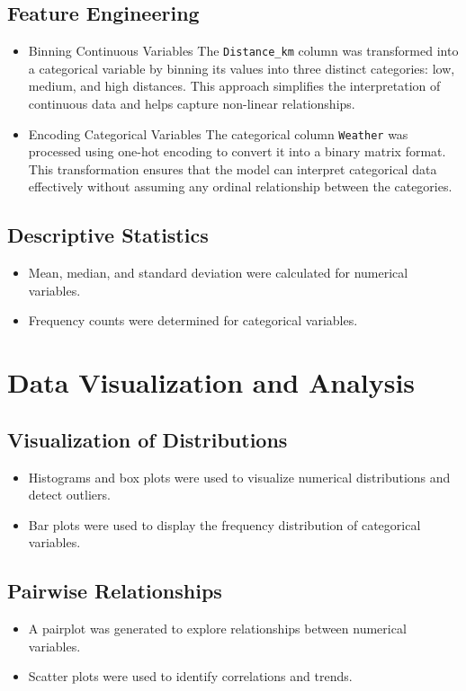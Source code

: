\documentclass{article}
\begin{document}
\subsection{Feature Engineering}
\begin{itemize}\item{Binning Continuous Variables}
The \texttt{Distance\_km} column was transformed into a categorical variable by binning its values into three distinct categories: low, medium, and high distances. This approach simplifies the interpretation of continuous data and helps capture non-linear relationships.

\item{Encoding Categorical Variables}
The categorical column \texttt{Weather} was processed using one-hot encoding to convert it into a binary matrix format. This transformation ensures that the model can interpret categorical data effectively without assuming any ordinal relationship between the categories.\end{itemize}

\subsection{Descriptive Statistics}
\begin{itemize}
    \item Mean, median, and standard deviation were calculated for numerical variables.
    \item Frequency counts were determined for categorical variables.
\end{itemize}

\section{Data Visualization and Analysis}

\subsection{Visualization of Distributions}
\begin{itemize}
    \item Histograms and box plots were used to visualize numerical distributions and detect outliers.
    \item Bar plots were used to display the frequency distribution of categorical variables.
\end{itemize}

\subsection{Pairwise Relationships}
\begin{itemize}
    \item A pairplot was generated to explore relationships between numerical variables.
    \item Scatter plots were used to identify correlations and trends.
\end{itemize}
\end{document}
